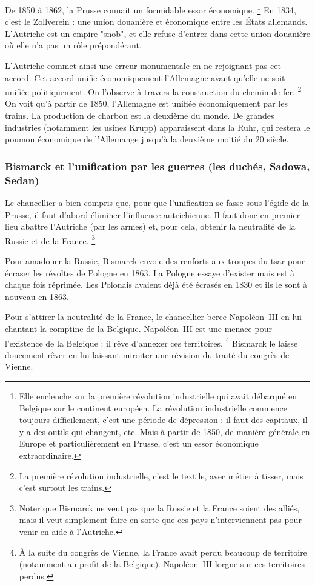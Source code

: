 \documentclass[12pt]{report}
\begin{document}
De 1850 à 1862, la Prusse connait un formidable essor économique.
\footnote{Elle enclenche sur la première révolution industrielle qui avait débarqué en Belgique sur le continent européen. La révolution industrielle commence toujours difficilement, c'est une période de dépression : il faut des capitaux, il y a des outils qui changent, etc. Mais à partir de 1850, de manière générale en Europe et particulièrement en Prusse, c'est un essor économique extraordinaire.}
En 1834, c'est le Zollverein : une union douanière et économique entre les États allemands.
L'Autriche est un empire "snob", et elle refuse d'entrer dans cette union douanière où elle n'a pas un rôle prépondérant.

L’Autriche commet ainsi une erreur monumentale en ne rejoignant pas cet accord. 
Cet accord unifie économiquement l'Allemagne avant qu'elle ne soit unifiée politiquement.
On l'observe à travers la construction du chemin de fer.
\footnote{La première révolution industrielle, c'est le textile, avec métier à tisser, mais c'est surtout les trains.}
On voit qu'à partir de 1850, l'Allemagne est unifiée économiquement par les trains.
La production de charbon est la deuxième du monde.
De grandes industries (notamment les usines Krupp) apparaissent dans la Ruhr, qui restera le poumon économique de l'Allemange jusqu'à la deuxième moitié du 20 siècle.

\subsubsection{Bismarck et l'unification par les guerres (les duchés, Sadowa, Sedan)}

Le chancellier a bien compris que, pour que l'unification se fasse sous l'égide de la Prusse, il faut d'abord éliminer l'influence autrichienne.
Il faut donc en premier lieu abattre l'Autriche (par les armes) et, pour cela, obtenir la neutralité de la Russie et de la France.
\footnote{Noter que Bismarck ne veut pas que la Russie et la France soient des alliés, mais il veut simplement faire en sorte que ces pays n'interviennent pas pour venir en aide à l'Autriche.}

Pour amadouer la Russie, Bismarck envoie des renforts aux troupes du tsar pour écraser les révoltes de Pologne en 1863.
La Pologne essaye d’exister mais est à chaque fois réprimée.
Les Polonais avaient déjà été écrasés en 1830 et ils le sont à nouveau en 1863.

Pour s'attirer la neutralité de la France, le chancellier berce Napoléon~III en lui chantant la comptine de la Belgique.
Napoléon~III est une menace pour l'existence de la Belgique : il rêve d'annexer ces territoires.
\footnote{À la suite du congrès de Vienne, la France avait perdu beaucoup de territoire (notamment au profit de la Belgique). Napoléon~III lorgne sur ces territoires perdus.}
Bismarck le laisse doucement rêver en lui laissant miroiter une révision du traité du congrès de Vienne.
\end{document}
